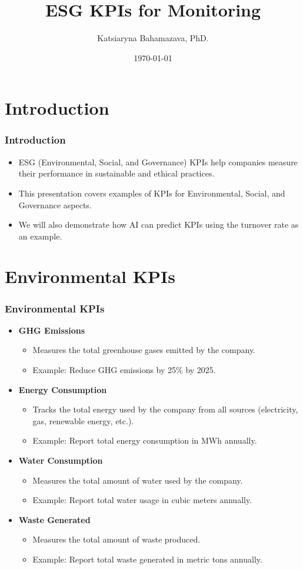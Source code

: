\documentclass{beamer}
\title{ESG KPIs for Monitoring}
\author{Katsiaryna Bahamazava, PhD.}
\institute{Mathematical department of Politecnico di Torino}
\date{\today}
\begin{document}
\frame{\titlepage}

\section{Introduction}

\begin{frame}
\frametitle{Introduction}
\begin{itemize}
    \item ESG (Environmental, Social, and Governance) KPIs help companies measure their performance in sustainable and ethical practices.
    \item This presentation covers examples of KPIs for Environmental, Social, and Governance aspects.
    \item We will also demonstrate how AI can predict KPIs using the turnover rate as an example.
\end{itemize}
\end{frame}

\section{Environmental KPIs}

\begin{frame}
\frametitle{Environmental KPIs}
\begin{itemize}
    \item \textbf{GHG Emissions}
        \begin{itemize}
            \item Measures the total greenhouse gases emitted by the company.
            \item Example: Reduce GHG emissions by 25\% by 2025.
        \end{itemize}
    \item \textbf{Energy Consumption}
        \begin{itemize}
            \item Tracks the total energy used by the company from all sources (electricity, gas, renewable energy, etc.).
            \item Example: Report total energy consumption in MWh annually.
        \end{itemize}
    \item \textbf{Water Consumption}
        \begin{itemize}
            \item Measures the total amount of water used by the company.
            \item Example: Report total water usage in cubic meters annually.
        \end{itemize}
    \item \textbf{Waste Generated}
        \begin{itemize}
            \item Measures the total amount of waste produced.
            \item Example: Report total waste generated in metric tons annually.
        \end{itemize}
\end{itemize}
\end{frame}
\end{document}
